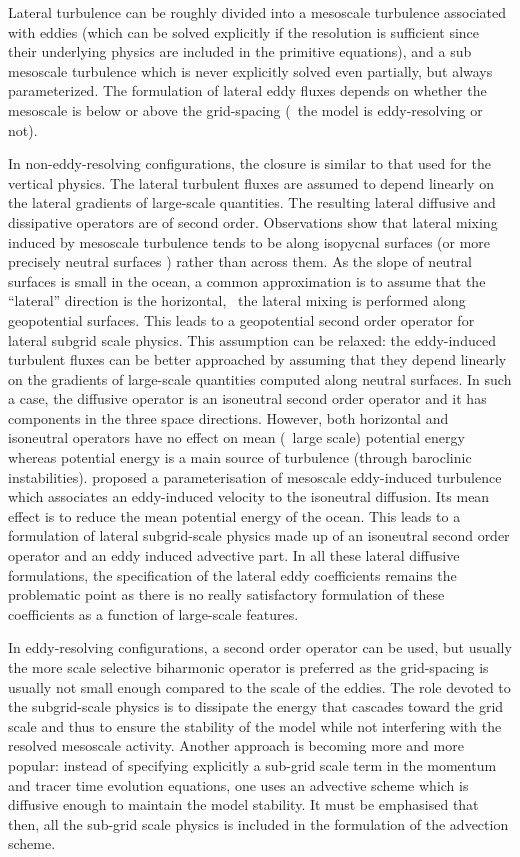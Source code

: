 \documentclass[../main/NEMO_manual]{subfiles}
\begin{document}
Lateral turbulence can be roughly divided into a mesoscale turbulence associated with eddies
(which can be solved explicitly if the resolution is sufficient since
their underlying physics are included in the primitive equations),
and a sub mesoscale turbulence which is never explicitly solved even partially,
but always parameterized.
The formulation of lateral eddy fluxes depends on whether
the mesoscale is below or above the grid-spacing (\ie\ the model is eddy-resolving or not).

In non-eddy-resolving configurations, the closure is similar to that used for the vertical physics.
The lateral turbulent fluxes are assumed to depend linearly on
the lateral gradients of large-scale quantities.
The resulting lateral diffusive and dissipative operators are of second order.
Observations show that
lateral mixing induced by mesoscale turbulence tends to be along isopycnal surfaces
(or more precisely neutral surfaces \cite{mcdougall_JPO87}) rather than across them.
As the slope of neutral surfaces is small in the ocean,
a common approximation is to assume that the ``lateral'' direction is the horizontal,
\ie\ the lateral mixing is performed along geopotential surfaces.
This leads to a geopotential second order operator for lateral subgrid scale physics.
This assumption can be relaxed:
the eddy-induced turbulent fluxes can be better approached by assuming that
they depend linearly on the gradients of large-scale quantities computed along neutral surfaces.
In such a case, the diffusive operator is an isoneutral second order operator and
it has components in the three space directions.
However, both horizontal and isoneutral operators have no effect on
mean (\ie\ large scale) potential energy whereas
potential energy is a main source of turbulence (through baroclinic instabilities).
\citet{gent.mcwilliams_JPO90} proposed a parameterisation of mesoscale eddy-induced turbulence which
associates an eddy-induced velocity to the isoneutral diffusion.
Its mean effect is to reduce the mean potential energy of the ocean.
This leads to a formulation of lateral subgrid-scale physics made up of
an isoneutral second order operator and an eddy induced advective part.
In all these lateral diffusive formulations,
the specification of the lateral eddy coefficients remains the problematic point as
there is no really satisfactory formulation of these coefficients as
a function of large-scale features.

In eddy-resolving configurations, a second order operator can be used,
but usually the more scale selective biharmonic operator is preferred as
the grid-spacing is usually not small enough compared to the scale of the eddies.
The role devoted to the subgrid-scale physics is to dissipate the energy that
cascades toward the grid scale and thus to ensure the stability of the model while
not interfering with the resolved mesoscale activity.
Another approach is becoming more and more popular:
instead of specifying explicitly a sub-grid scale term in
the momentum and tracer time evolution equations,
one uses an advective scheme which is diffusive enough to maintain the model stability.
It must be emphasised that then,
all the sub-grid scale physics is included in the formulation of the advection scheme.
\end{document}
